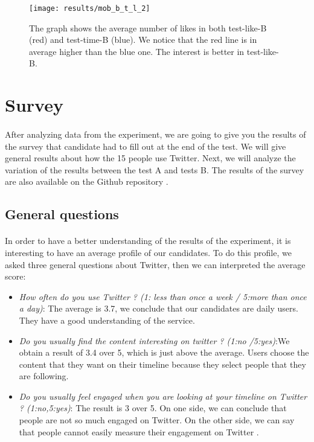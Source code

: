 \begin{figure}[h] 
\centering 
\texttt{[image: results/mob\_b\_t\_l\_2]} 
\caption[Number of likes in tests B]{The graph shows the average number of likes in both test-like-B (red) and test-time-B (blue). We notice that the red line is in average higher than the blue one. The interest is better in test-like-B.}
\label{fig:mob_b_t_l_2} 
\end{figure}


\section{Survey}

\paragraph{}
After analyzing data from the experiment, we are going to give you the results of the survey that candidate had to fill out at the end of the test. We will give general results about how the 15 people use Twitter. Next, we will analyze the variation of the results between the test A and tests B. The results of the survey are also available on the Github repository \cite{tw_github}.

\subsection{General questions}

\paragraph{}
In order to have a better understanding of the results of the experiment, it is interesting to have an average profile of our candidates. To do this profile, we asked three general questions about Twitter, then we can interpreted the average score:

\begin{itemize}
	\item \textit{How often do you use Twitter ? (1: less than once a week / 5:more than once a day)}: The average is 3.7, we conclude that our candidates are daily users. They have a good understanding of the service.
	\item \textit{Do you usually find the content interesting on twitter ? (1:no /5:yes)}:We obtain a result of 3.4 over 5, which is just above the average. Users choose the content that they want on their timeline because they select people that they are following.
	\item \textit{Do you usually feel engaged when you are looking at your timeline on Twitter ? (1:no,5:yes)}: The result is 3 over 5. On one side, we can conclude that people are not so much engaged on Twitter. On the other side, we can say that people cannot easily measure their engagement on Twitter \cite{s_engag_measure}.
\end{itemize}

